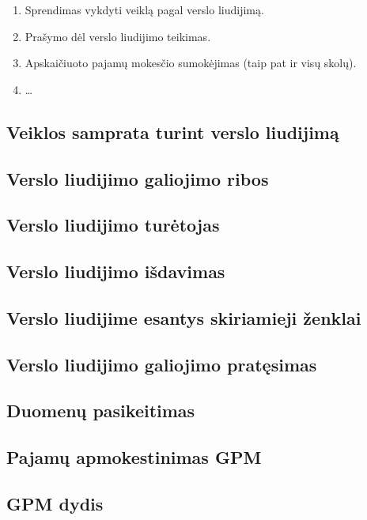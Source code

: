 \begin{enumerate}
  \item Sprendimas vykdyti veiklą pagal verslo liudijimą.
  \item Prašymo dėl verslo liudijimo teikimas.
  \item Apskaičiuoto pajamų mokesčio sumokėjimas (taip pat ir visų skolų).
  \item …
\end{enumerate}

\subsection{Veiklos samprata turint verslo liudijimą}

\subsection{Verslo liudijimo galiojimo ribos}

\subsection{Verslo liudijimo turėtojas}

\subsection{Verslo liudijimo išdavimas}

\subsection{Verslo liudijime esantys skiriamieji ženklai}

\subsection{Verslo liudijimo galiojimo pratęsimas}

\subsection{Duomenų pasikeitimas}

\subsection{Pajamų apmokestinimas GPM}

\subsection{GPM dydis}

